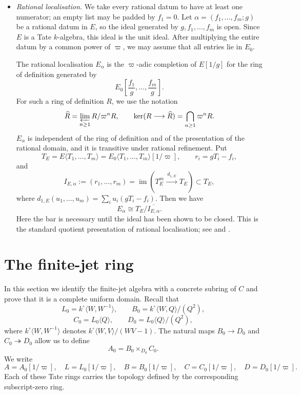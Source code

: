 \documentclass[11pt,reqno]{amsart}
\theoremstyle{definition}
\newcommand{\onto}{\twoheadrightarrow}
\begin{document}
\begin{itemize}
\item \emph{Rational localisation.}
We take every rational datum to have at least one numerator; an empty list may be
padded by $f_1=0$.  Let
$\alpha=(f_1,\dots,f_m;g)$ be a rational datum in $E$, so the ideal generated by
$g,f_1,\dots,f_m$ is open.  Since $E$ is a Tate $k$-algebra, this ideal is the unit ideal.  After multiplying the entire datum by a common power of $\varpi$, we may assume that all entries lie in $E_0$.

The rational localisation $E_\alpha$ is the $\varpi$-adic completion of $E[1/g]$ for the ring of definition generated by
\[
  E_0\left[\frac{f_1}{g},\dots,\frac{f_m}{g}\right].
\]
For such a ring of definition $R$, we use the notation
\[
  \widehat R=\varprojlim_{n\geq1}R/\varpi^nR,
  \qquad
  \ker(R\longrightarrow\widehat R)=\bigcap_{n\geq1}\varpi^nR.
\]
$E_\alpha$ is independent of the ring of definition and of the presentation of the rational
domain, and it is transitive under rational refinement.  Put
\[
  T_E=E\langle T_1,\dots,T_m\rangle
  =E_0\langle T_1,\dots,T_m\rangle[1/\varpi],
  \qquad r_i=gT_i-f_i,
\]
and
\[
  I_{E,\alpha}:=(r_1,\dots,r_m)
  =\operatorname{im}\left(
    T_E^m\xrightarrow{\ d_{1,E}\ }T_E
  \right)\subset T_E,
\]
  where
  $d_{1,E}(u_1,\dots,u_m)=\sum_i u_i(gT_i-f_i).$ Then we have
\begin{equation}\label{eq:graph-model}
  E_\alpha\cong T_E/\overline{I_{E,\alpha}}.
\end{equation}
Here the bar is necessary until the ideal has been shown to be closed.  This is the
standard quotient presentation of rational localisation; see
\cite[Notations, (1.2), Proposition~1.3, Lemma~1.5]{Huber94} and
\cite[Definition~3.6]{HK}.
\end{itemize}


\section{The finite-jet ring}\label{sec:the-global-ring}

In this section we identify the finite-jet algebra with a concrete subring of
$C$ and prove that it is a complete uniform domain.  Recall that
\[
  L_0=k^\circ\langle W,W^{-1}\rangle,
  \qquad
  B_0=k^\circ\langle W,Q\rangle/(Q^2),
\]
\[
  C_0=L_0\langle Q\rangle,
  \qquad
  D_0=L_0\langle Q\rangle/(Q^2),
\]
where $k^\circ\langle W,W^{-1}\rangle$ denotes
$k^\circ\langle W,V\rangle/(WV-1)$.  The natural maps
$B_0\to D_0$ and $C_0\onto D_0$ allow us to define
\[
  A_0=B_0\times_{D_0}C_0.
\]
We write
\[
  A=A_0[1/\varpi],\quad
  L=L_0[1/\varpi],\quad
  B=B_0[1/\varpi],\quad
  C=C_0[1/\varpi],\quad
  D=D_0[1/\varpi].
\]
Each of these Tate rings carries the topology defined by the corresponding
subscript-zero ring.
\end{document}
